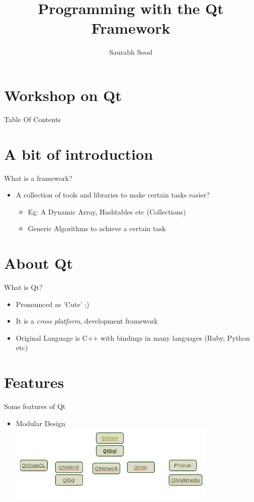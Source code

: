 \documentclass{beamer}
\begin{document}
\section{Workshop on Qt}
\title{Programming with the Qt Framework}
\author{Saurabh Sood}

\begin{frame}
\titlepage
\end{frame}

\begin{frame}{Table Of Contents}
\tableofcontents
\end{frame}

\section{A bit of introduction}
\begin{frame}{What is a framework?}
\pause
\begin{itemize}
\item A collection of tools and libraries to make certain tasks easier? \pause
\begin{itemize}
\item Eg: A Dynamic Array, Hashtables etc (Collections)
\item Generic Algorithms to achieve a certain task
\end{itemize}
\end{itemize}
\end{frame}

\section{About Qt}
\begin{frame}{What is Qt?}\pause
\begin{itemize}
\item Pronounced as 'Cute' ;) \pause
\item It is a \textit{cross platform}, development framework
\item Original Language is C++ with bindings in many languages (Ruby, Python etc) \pause
\end{itemize}
\end{frame}

\section{Features}
\begin{frame}{Some features of Qt}
\begin{itemize}
\pause
\item Modular Design
\includegraphics[width=10cm]{qt-mod.png}
\end{itemize}
\end{frame}
\end{document}

